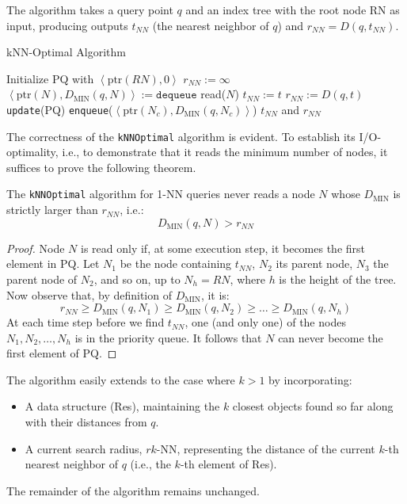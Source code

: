 The algorithm takes a query point $q$ and an index tree with the root node RN as input, producing outputs $t_{NN}$ (the nearest neighbor of $q$) and $r_{NN}=D(q,t_{NN})$.
\begin{algorithm}[H]
    \caption{kNN-Optimal Algorithm}
        \begin{algorithmic}[1]
            \State Initialize PQ with $\left\langle \text{ptr}(RN),0 \right\rangle $
            \State $r_{NN}:=\infty$
                \State $\left\langle \text{ptr}(N),D_{\text{MIN}}(q,N) \right\rangle := \texttt{dequeue}$
                \State read($N$)
                            \State $t_{NN} := t$
                            \State $r_{NN} := D(q,t)$
                            \State \texttt{update}(PQ)
                        \EndIf
                    \EndFor
                \Else 
                            \State \texttt{enqueue}($\left\langle \text{ptr}(N_c),D_{\text{MIN}}(q,N_c) \right\rangle$)
                        \EndIf 
                    \EndFor
                \EndIf
            \EndWhile 
            \State \Return $t_{NN}$ and $r_{NN}$
        \end{algorithmic}
\end{algorithm}
The correctness of the \texttt{kNNOptimal} algorithm is evident. 
To establish its I/O-optimality, i.e., to demonstrate that it reads the minimum number of nodes, it suffices to prove the following theorem.
\begin{theorem}
    The \texttt{kNNOptimal} algorithm for 1-NN queries never reads a node $N$ whose $D_{\text{MIN}}$ is strictly larger than $r_{NN}$, i.e.: 
    \[D_{\text{MIN}}(q,N) > r_{NN}\]
\end{theorem}
\begin{proof}
    Node $N$ is read only if, at some execution step, it becomes the first element in PQ. 
    Let $N_1$ be the node containing $t_{NN}$, $N_2$ its parent node, $N_3$ the parent node of $N_2$, and so on, up to $N_h = RN$, where $h$ is the height of the tree.
    Now observe that, by definition of $D_{\text{MIN}}$, it is:
    \[r_{NN} \geq D_{\text{MIN}}(q,N_1) \geq D_{\text{MIN}}(q,N_2) \geq \dots \geq D_{\text{MIN}}(q,N_h)\]
    At each time step before we find $t_{NN}$, one (and only one) of the nodes $N_1, N_2, \dots, N_h$ is in the priority queue. 
    It follows that $N$ can never become the first element of PQ.
\end{proof}
The algorithm easily extends to the case where $k > 1$ by incorporating:
\begin{itemize}
    \item A data structure (Res), maintaining the $k$ closest objects found so far along with their distances from $q$.
    \item A current search radius, $rk$-NN, representing the distance of the current $k$-th nearest neighbor of $q$ (i.e., the $k$-th element of Res).
\end{itemize}
The remainder of the algorithm remains unchanged.


